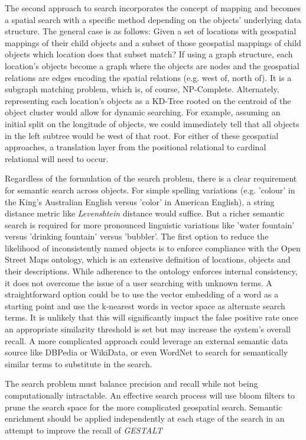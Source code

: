 The second approach to search incorporates the concept of mapping and becomes a spatial search with a specific method depending on the objects' underlying data structure. 
The general case is as follows: Given a set of locations with geospatial mappings of their child objects and a subset of those geospatial mappings of child objects which location does that subset match? 
If using a graph structure, each location's objects become a graph where the objects are nodes and the geospatial relations are edges encoding the spatial relations (e.g. west of, north of). It is a subgraph matching problem, which is, of course, NP-Complete. 
Alternately, representing each location's objects as a KD-Tree rooted on the centroid of the object cluster would allow for dynamic searching. For example, assuming an initial split on the longitude of objects, we could immediately tell that all objects in the left subtree would be west of that root. 
For either of these geospatial approaches, a translation layer from the positional relational to cardinal relational will need to occur.

Regardless of the formulation of the search problem, there is a clear requirement for semantic search across objects. For simple spelling variations (e.g. 'colour' in the King's Australian English versus 'color' in American English), a string distance metric like \textit{Levenshtein} distance would suffice. 
But a richer semantic search is required for more pronounced linguistic variations like 'water fountain' versus 'drinking fountain' versus 'bubbler'. 
The first option to reduce the likelihood of inconsistently named objects is to enforce compliance with the Open Street Maps ontology, which is an extensive definition of locations, objects and their descriptions. 
While adherence to the ontology enforces internal consistency, it does not overcome the issue of a user searching with unknown terms. 
A straightforward option could be to use the vector embedding of a word as a starting point and use the k-nearest words in vector space as alternate search terms. 
It is unlikely that this will significantly impact the false positive rate once an appropriate similarity threshold is set but may increase the system's overall recall. 
A more complicated approach could leverage an external semantic data source like DBPedia or WikiData, or even WordNet to search for semantically similar terms to substitute in the search. 

The search problem must balance precision and recall while not being computationally intractable. An effective search process will use bloom filters to prune the search space for the more complicated geospatial search. Semantic enrichment should be applied independently at each stage of the search in an attempt to improve the recall of \textit{GESTALT}

